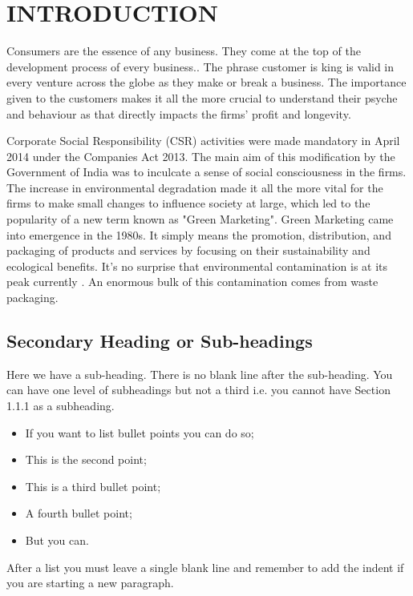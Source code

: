 \documentclass[a4paper,10pt]{article}
\begin{document}
\section{INTRODUCTION}

Consumers are the essence of any business. They come at the top of the development process of every business.\cite{Witek2020}. The phrase customer is king is valid in every venture across the globe as they make or break a business. The importance given to the customers makes it all the more crucial to understand their psyche and behaviour as that directly impacts the firms' profit and longevity. 

Corporate Social Responsibility (CSR) activities were made mandatory in April 2014 under the Companies Act 2013. The main aim of this modification by the Government of India was to inculcate a sense of social consciousness in the firms. The increase in environmental degradation made it all the more vital for the firms to make small changes to influence society at large, which led to the popularity of a new term known as "Green Marketing". Green Marketing came into emergence in the 1980s. It simply means the promotion, distribution, and packaging of products and services by focusing on their sustainability and ecological benefits. 
It's no surprise that environmental contamination is at its peak currently \cite{RaviVyas2023}. An enormous bulk of this contamination comes from waste packaging. 

\subsection{Secondary Heading or Sub-headings}

Here we have a sub-heading. There is no blank line after the sub-heading. You can have one level of subheadings but not a third i.e. you cannot have Section 1.1.1 as a subheading.

\begin{itemize}
    \item If you want to list bullet points you can do so;
    \item This is the second point;
    \item This is a third bullet point;
    \item A fourth bullet point;
    \item But you can.
\end{itemize}   

After a list you must leave a single blank line and remember to add the indent if you are starting a new paragraph.
\end{document}
